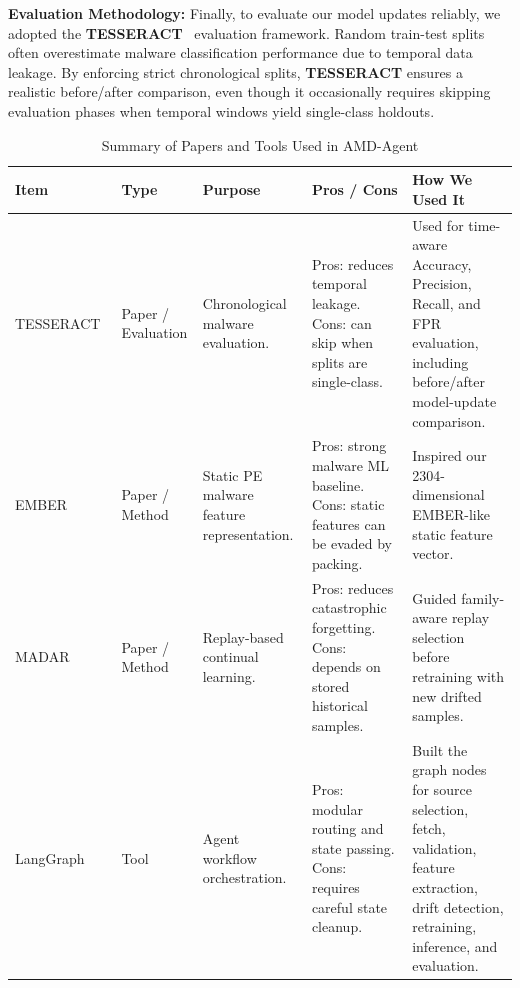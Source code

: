 \documentclass[letterpaper,10pt,conference]{ieeeconf}
\begin{document}
\textbf{Evaluation Methodology:} Finally, to evaluate our model updates reliably, we adopted the \textbf{TESSERACT}~\cite{pendlebury2019tesseract} evaluation framework. Random train-test splits often overestimate malware classification performance due to temporal data leakage. By enforcing strict chronological splits, \textbf{TESSERACT} ensures a realistic before/after comparison, even though it occasionally requires skipping evaluation phases when temporal windows yield single-class holdouts.

\begin{table}[htbp]
\centering
\caption{Summary of Papers and Tools Used in AMD-Agent}
\label{tab:related_work}
\scriptsize
\renewcommand{\arraystretch}{1.25}
\begin{tabular}{|>{\raggedright\arraybackslash}p{1.9cm}|>{\raggedright\arraybackslash}p{1.7cm}|>{\raggedright\arraybackslash}p{3.0cm}|>{\raggedright\arraybackslash}p{3.4cm}|>{\raggedright\arraybackslash}p{4.6cm}|}
\hline
\textbf{Item} & \textbf{Type} & \textbf{Purpose} & \textbf{Pros / Cons} & \textbf{How We Used It} \\
\hline

TESSERACT~\cite{pendlebury2019tesseract} & Paper / Evaluation &
Chronological malware evaluation. &
Pros: reduces temporal leakage. Cons: can skip when splits are single-class. &
Used for time-aware Accuracy, Precision, Recall, and FPR evaluation, including before/after model-update comparison. \\
\hline

EMBER~\cite{anderson2018ember} & Paper / Method &
Static PE malware feature representation. &
Pros: strong malware ML baseline. Cons: static features can be evaded by packing. &
Inspired our 2304-dimensional EMBER-like static feature vector. \\
\hline

MADAR~\cite{rahman2025madar} & Paper / Method &
Replay-based continual learning. &
Pros: reduces catastrophic forgetting. Cons: depends on stored historical samples. &
Guided family-aware replay selection before retraining with new drifted samples. \\
\hline

LangGraph~\cite{langgraph} & Tool &
Agent workflow orchestration. &
Pros: modular routing and state passing. Cons: requires careful state cleanup. &
Built the graph nodes for source selection, fetch, validation, feature extraction, drift detection, retraining, inference, and evaluation. \\
\hline


\end{tabular}
\end{table}
\end{document}
